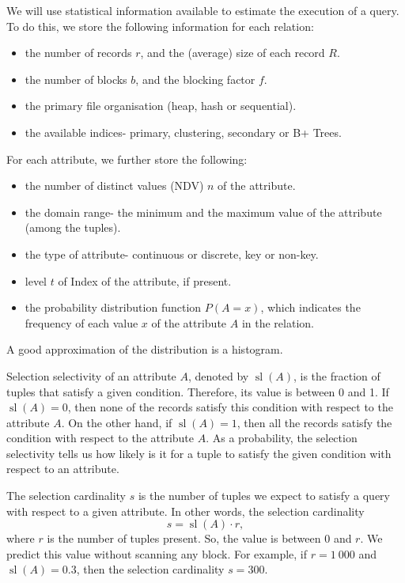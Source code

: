 \documentclass[a4paper, openany]{memoir}
\theoremstyle{definition}
\theoremstyle{plain}
\begin{document}
We will use statistical information available to estimate the execution of a query. To do this, we store the following information for each relation:
\begin{itemize}
    \item the number of records $r$, and the (average) size of each record $R$.
    \item the number of blocks $b$, and the blocking factor $f$.
    \item the primary file organisation (heap, hash or sequential).
    \item the available indices- primary, clustering, secondary or B+ Trees.
\end{itemize}
For each attribute, we further store the following:
\begin{itemize}
    \item the number of distinct values (NDV) $n$ of the attribute.
    \item the domain range- the minimum and the maximum value of the attribute (among the tuples).
    \item the type of attribute- continuous or discrete, key or non-key.
    \item level $t$ of Index of the attribute, if present.
    \item the probability distribution function $P(A = x)$, which indicates the frequency of each value $x$ of the attribute $A$ in the relation.
\end{itemize}
A good approximation of the distribution is a histogram.

Selection selectivity of an attribute $A$, denoted by $\operatorname{sl}(A)$, is the fraction of tuples that satisfy a given condition. Therefore, its value is between 0 and 1. If $\operatorname{sl}(A) = 0$, then none of the records satisfy this condition with respect to the attribute $A$. On the other hand, if $\operatorname{sl}(A) = 1$, then all the records satisfy the condition with respect to the attribute $A$. As a probability, the selection selectivity tells us how likely is it for a tuple to satisfy the given condition with respect to an attribute.

The selection cardinality $s$ is the number of tuples we expect to satisfy a query with respect to a given attribute. In other words, the selection cardinality
\[s = \operatorname{sl}(A) \cdot r,\]
where $r$ is the number of tuples present. So, the value is between 0 and $r$. We predict this value without scanning any block. For example, if $r = 1 \ 000$ and $\operatorname{sl}(A) = 0.3$, then the selection cardinality $s = 300$. 
\end{document}
